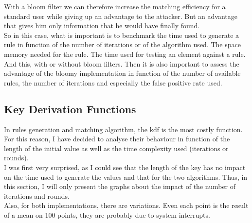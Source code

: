 \documentclass{eplmastersthesis}
\begin{document}
With a bloom filter we can therefore increase the matching efficiency for a standard user while giving up an advantage to the attacker. But an advantage that gives him only information that he would have finally found.\\

So in this case, what is important is to benchmark the time used to generate a rule in function of the number of iterations or of the algorithm used. The space memory needed for the rule. The time used for testing an element against a rule.\\
And this, with or without bloom filters. Then it is also important to assess the advantage of the bloomy implementation in function of the number of available rules, the number of iterations and especially the false positive rate used.

\subsection{Key Derivation Functions}
\label{sec:KeyDerivationFunction}
In rules generation and matching algorithm, the \gls{kdf} is the most costly function. For this reason, I have decided to analyse their behaviour in function of the length of the initial value as well as the time complexity used (iterations or rounds).\\

I was first very surprised, as I could see that the length of the key has no impact on the time used to generate the values and that for the two algorithms. Thus, in this section, I will only present the graphs about the impact of the number of iterations and rounds.\\

Also, for both implementations, there are variations. Even each point is the result of a mean on 100 points, they are probably due to system interrupts.\\
\end{document}
